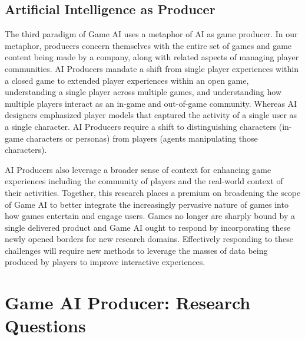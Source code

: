 \documentclass[conference]{IEEEtran}
\newcommand{\mytodo}[1]{\textbf{[[#1]]}}
\begin{document}
\subsection{Artificial Intelligence as Producer}

The third paradigm of Game AI uses a metaphor of AI as game producer. 
In our metaphor, producers concern themselves with the entire set of games and game content being made by a company, along with related aspects of managing player communities. 
AI Producers mandate a shift from single player experiences within a closed game to extended player experiences within an open game, understanding a single player across multiple games, and understanding how multiple players interact as an in-game and out-of-game community. 
Whereas AI designers emphasized player models that captured the activity of a single user as a single character. AI Producers require a shift to distinguishing characters (in-game characters or personas) from players (agents manipulating those characters). 

AI Producers also leverage a broader sense of context for enhancing game experiences including the community of players and the real-world context of their activities.
Together, this research places a premium on broadening the scope of Game AI to better integrate the increasingly pervasive nature of games into how games entertain and engage users. 
Games no longer are sharply bound by a single delivered product and Game AI ought to respond by incorporating these newly opened borders for new research domains. Effectively responding to these challenges will require new methods to leverage the masses of data being produced by players to improve interactive experiences.



\section{Game AI Producer: Research Questions}
\end{document}
